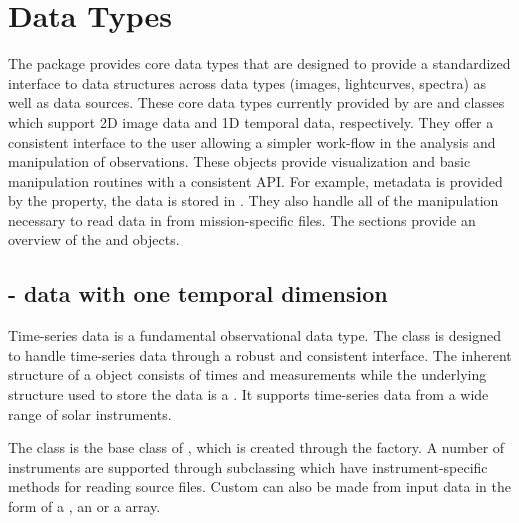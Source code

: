 \section{Data Types}
\label{sec:data_types}
The \sunpypkg package provides core data types that are designed to provide a standardized interface to data structures across data types (images, lightcurves, spectra) as well as data sources.
These core data types currently provided by \sunpypkg are \Map and \Timeseries classes which support 2D image data and 1D temporal data, respectively.
They offer a consistent interface to the user allowing a simpler work-flow in the analysis and manipulation of observations.
These objects provide visualization and basic manipulation routines with a consistent API.
For example, metadata is provided by the  property, the data is stored in .
They also handle all of the manipulation necessary to read data in from mission-specific files.
The sections provide an overview of the \Timeseries and \Map objects.

\subsection{\Timeseries - data with one temporal dimension}
\label{sec:timeseries}
Time-series data is a fundamental observational data type.
The \Timeseries class is designed to handle time-series data through a robust and consistent interface.
The inherent structure of a \Timeseries object consists of times and measurements while the underlying structure used to store the data is a .
It supports time-series data from a wide range of solar instruments.

The \GenericTimeSeries class is the base class of \Timeseries, which is created through the \Timeseries factory.
A number of instruments are supported through subclassing which have instrument-specific methods for reading source files.
Custom \Timeseries can also be made from input data in the form of a , an  or a  array.

